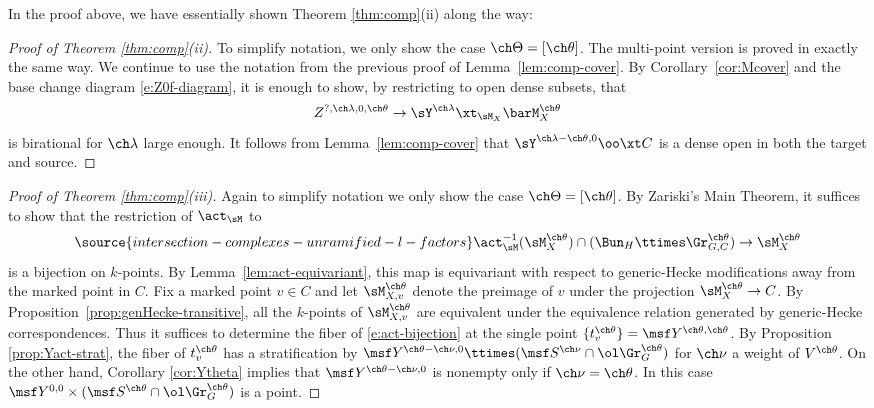 In the proof above, we have essentially shown
Theorem \ref{thm:comp}(ii) along the way:

\begin{proof}[Proof of Theorem \ref{thm:comp}(ii)]
To simplify notation, we only show the case $\ch\Theta = [\ch\theta]$.
The multi-point version is proved in exactly the same way.
We continue to use the notation from the previous proof
of Lemma~\ref{lem:comp-cover}.
By Corollary~\ref{cor:Mcover} and the base change diagram \eqref{e:Z0f-diagram},
it is enough to show, by restricting to open dense subsets, that
\[ Z^{?,\ch\lambda,0,\ch\theta} \to \sY^{\ch\lambda} \xt_{\sM_X} \barM_X^{\ch\theta} \]
is birational for $\ch\lambda$ large enough.
It follows from Lemma~\ref{lem:comp-cover} that
$\sY^{\ch\lambda-\ch\theta,0} \oo\xt C$ is a dense open
in both the target and source.
\end{proof}


\begin{proof}[Proof of Theorem \ref{thm:comp}(iii)]
Again to simplify notation we only show the case $\ch\Theta = [\ch\theta]$.
By Zariski's Main Theorem, it suffices to show that
the restriction of $\act_\sM$ to
\begin{equation} \label{e:act-bijection}
\source{intersection-complexes-unramified-l-factors}
\act_\sM^{-1}(\sM^{\ch\theta}_X) \cap (\Bun_H \ttimes \Gr_{G,C}^{\ch\theta}) \to \sM_X^{\ch\theta}
\end{equation}
is a bijection on $k$-points.
By Lemma~\ref{lem:act-equivariant}, this map is equivariant with respect to
generic-Hecke modifications away from the marked point in $C$.
Fix a marked point $v\in C$ and let $\sM^{\ch\theta}_{X,v}$ denote
the preimage of $v$ under the projection $\sM^{\ch\theta}_X \to C$.
By Proposition~\ref{prop:genHecke-transitive}, all the $k$-points
of $\sM^{\ch\theta}_{X,v}$ are equivalent under
the equivalence relation generated by generic-Hecke correspondences.
Thus it suffices to determine the fiber of \eqref{e:act-bijection}
at the single point $\{t_v^{\ch\theta}\} = \msf Y^{\ch\theta,\ch\theta}$.
By Proposition \ref{prop:Yact-strat},
the fiber of $t_v^{\ch\theta}$ has a stratification by
$\msf Y^{\ch\theta-\ch\nu,0} \ttimes (\msf S^{\ch\nu} \cap \ol\Gr^{\ch\theta}_G)$
for $\ch\nu$ a weight of $V^{\ch\theta}$.
On the other hand, Corollary \ref{cor:Ytheta} implies that
$\msf Y^{\ch\theta-\ch\nu,0}$ is nonempty only if $\ch\nu=\ch\theta$.
In this case $\msf Y^{0,0} \times (\msf S^{\ch\theta}\cap \ol\Gr^{\ch\theta}_G)$
is a point.
\end{proof}

